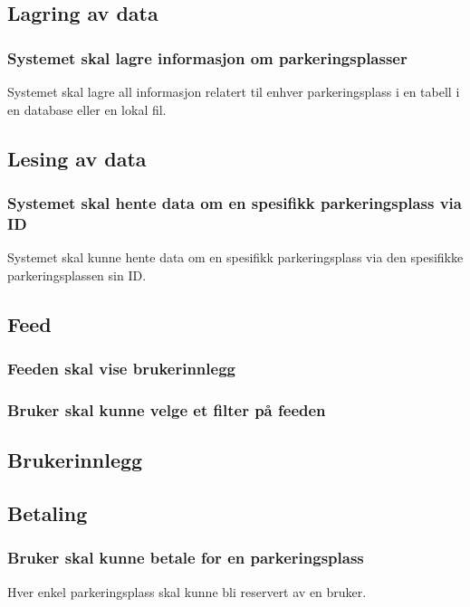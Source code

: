 \documentclass[12pt]{article}
\begin{document}
\subsection{Lagring av data}

\subsubsection{Systemet skal lagre informasjon om parkeringsplasser}
Systemet skal lagre all informasjon relatert til enhver parkeringsplass i en tabell i en database eller en lokal fil.

\subsection{Lesing av data}

\subsubsection{Systemet skal hente data om en spesifikk parkeringsplass via ID}
Systemet skal kunne hente data om en spesifikk parkeringsplass via den spesifikke parkeringsplassen sin ID.

\subsection{Feed}

\subsubsection{Feeden skal vise brukerinnlegg}

\subsubsection{Bruker skal kunne velge et filter på feeden}

\subsection{Brukerinnlegg}

\subsection{Betaling}

\subsubsection{Bruker skal kunne betale for en parkeringsplass}
Hver enkel parkeringsplass skal kunne bli reservert av en bruker.
\end{document}
